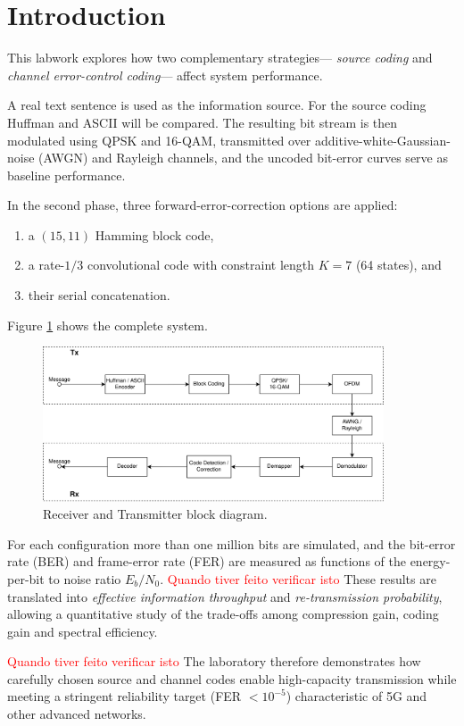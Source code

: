 \section{Introduction}

This labwork explores how two complementary strategies—
\emph{source coding} and \emph{channel error-control coding}—
affect system performance.

A real text sentence is used as the information source.
For the source coding Huffman and ASCII will be compared.
The resulting bit stream is then modulated using QPSK and 16-QAM,
transmitted over additive-white-Gaussian-noise (AWGN) and Rayleigh channels,
and the uncoded bit-error curves serve as baseline performance.

In the second phase, three forward-error-correction options are applied:  
\begin{enumerate}
  \item a $(15,11)$ Hamming block code,
  \item a rate-$1/3$ convolutional code with constraint length $K=7$ (64 states), and
  \item their serial concatenation.
\end{enumerate}

 Figure \ref{fig:RxTx} shows the complete system.

\begin{figure}[H]
  \centering
  \includegraphics[width=0.9\textwidth]{Images/BlockDiagram.png}
  \caption{Receiver and Transmitter block diagram.}
  \label{fig:RxTx}
\end{figure}


For each configuration more than one million bits are simulated, and the
bit-error rate (BER) and frame-error rate (FER) are measured as functions
of the energy-per-bit to noise ratio $E_b/N_0$.  
\textcolor{red}{Quando tiver feito verificar isto}
These results are translated into \emph{effective information throughput}
and \emph{re-transmission probability}, allowing a quantitative study of
the trade-offs among compression gain, coding gain and spectral efficiency.

\textcolor{red}{Quando tiver feito verificar isto}
The laboratory therefore demonstrates how carefully chosen source and
channel codes enable high-capacity transmission while meeting a stringent
reliability target (FER $<10^{-5}$) characteristic of 5G and other
advanced networks.
